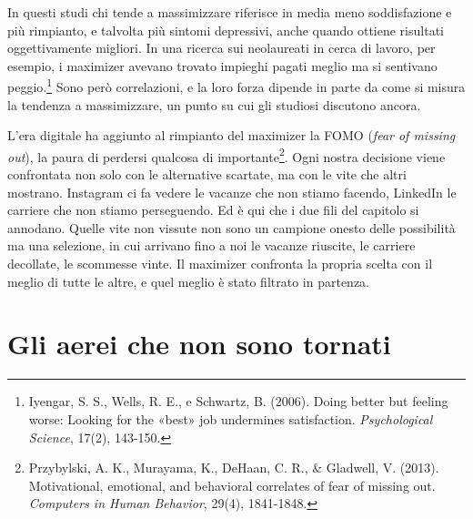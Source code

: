 
In questi studi chi tende a massimizzare riferisce in media meno soddisfazione e più rimpianto, e talvolta più sintomi depressivi, anche quando ottiene risultati oggettivamente migliori. In una ricerca sui neolaureati in cerca di lavoro, per esempio, i maximizer avevano trovato impieghi pagati meglio ma si sentivano peggio.\footnote{Iyengar, S. S., Wells, R. E., e Schwartz, B. (2006). Doing better but feeling worse: Looking for the «best» job undermines satisfaction. \textit{Psychological Science}, 17(2), 143-150.} Sono però correlazioni, e la loro forza dipende in parte da come si misura la tendenza a massimizzare, un punto su cui gli studiosi discutono ancora.

L'era digitale ha aggiunto al rimpianto del maximizer la FOMO (\textit{fear of missing out}), la paura di perdersi qualcosa di importante\footnote{Przybylski, A. K., Murayama, K., DeHaan, C. R., \& Gladwell, V. (2013). Motivational, emotional, and behavioral correlates of fear of missing out. \textit{Computers in Human Behavior}, 29(4), 1841-1848.}. Ogni nostra decisione viene confrontata non solo con le alternative scartate, ma con le vite che altri mostrano. Instagram ci fa vedere le vacanze che non stiamo facendo, LinkedIn le carriere che non stiamo perseguendo. Ed è qui che i due fili del capitolo si annodano. Quelle vite non vissute non sono un campione onesto delle possibilità ma una selezione, in cui arrivano fino a noi le vacanze riuscite, le carriere decollate, le scommesse vinte. Il maximizer confronta la propria scelta con il meglio di tutte le altre, e quel meglio è stato filtrato in partenza.

\section{Gli aerei che non sono tornati}
\label{sec:p2c30-gli-aerei-che}

